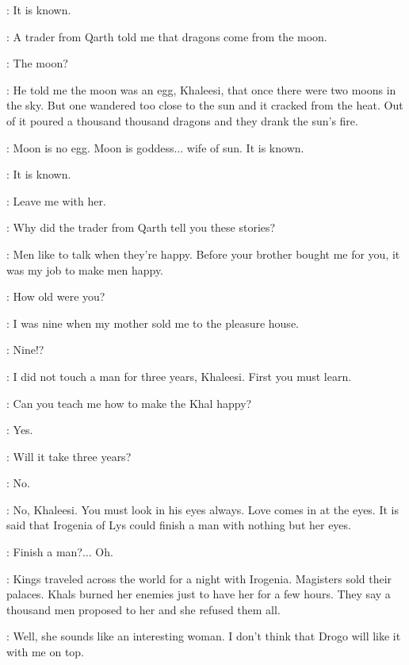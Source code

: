 \JHIQUI: It is known. 

\DOREAH: A trader from Qarth told me that dragons come from the moon. 

\DAENERYS: The moon? 

\DOREAH: He told me the moon was an egg, Khaleesi, that once there were two moons in the sky. But one wandered too close to the sun and it cracked from the heat. Out of it poured a thousand thousand dragons and they drank the sun's fire. 

\IRRI: Moon is no egg. Moon is goddess$\ldots$ wife of sun. It is known. 

\JHIQUI: It is known. 

\DAENERYS: Leave me with her. 


\DAENERYS: Why did the trader from Qarth tell you these stories? 

\DOREAH: Men like to talk when they're happy. Before your brother bought me for you, it was my job to make men happy. 

\DAENERYS: How old were you? 

\DOREAH: I was nine when my mother sold me to the pleasure house. 

\DAENERYS: Nine!?

\DOREAH: I did not touch a man for three years, Khaleesi. First you must learn. 

\DAENERYS: Can you teach me how to make the Khal happy? 

\DOREAH: Yes. 

\DAENERYS: Will it take three years? 

\DOREAH: No. 


\DOREAH: No, Khaleesi. You must look in his eyes always. Love comes in at the eyes. It is said that Irogenia of Lys could finish a man with nothing but her eyes. 

\DAENERYS: Finish a man?$\ldots$ Oh.

\DOREAH: Kings traveled across the world for a night with Irogenia. Magisters sold their palaces. Khals burned her enemies just to have her for a few hours. They say a thousand men proposed to her and she refused them all. 

\DAENERYS: Well, she sounds like an interesting woman. I don't think that Drogo will like it with me on top. 

